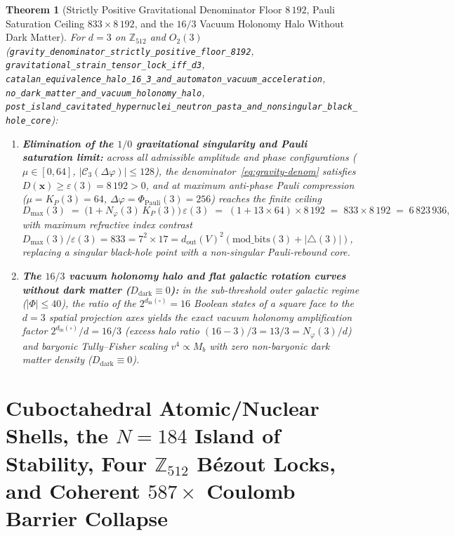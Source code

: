 \documentclass[11pt,a4paper]{article}
\theoremstyle{plain}
\newtheorem{theorem}{Theorem}[section]
\theoremstyle{definition}
\begin{document}
\begin{theorem}[Strictly Positive Gravitational Denominator Floor $8\,192$, Pauli Saturation Ceiling $833\times 8\,192$, and the $16/3$ Vacuum Holonomy Halo Without Dark Matter]
\label{thm:gravity-halo}
For $d=3$ on $\mathbb{Z}_{512}$ and $O_2(3)$ (\texttt{gravity\_denominator\_strictly\_positive\_floor\_8192}, \texttt{gravitational\_strain\_tensor\_lock\_iff\_d3}, \texttt{catalan\_equivalence\_halo\_16\_3\_and\_automaton\_vacuum\_acceleration}, \texttt{no\_dark\_matter\_and\_vacuum\_holonomy\_halo}, \texttt{post\_island\_cavitated\_hypernuclei\_neutron\_pasta\_and\_nonsingular\_black\_hole\_core}):
\begin{enumerate}[label=\textbf{(\roman*)},leftmargin=*]
\item \textbf{Elimination of the $1/0$ gravitational singularity and Pauli saturation limit:}
  across all admissible amplitude and phase configurations ($\mu\in[0,64]$, $|\mathcal{C}_3(\Delta\varphi)|\le 128$), the denominator~\eqref{eq:gravity-denom} satisfies $D(\mathbf{x}) \ge \varepsilon(3) = 8\,192 > 0$, and at maximum anti-phase Pauli compression ($\mu = K_P(3) = 64$, $\Delta\varphi = \Phi_{\mathrm{Pauli}}(3) = 256$) reaches the finite ceiling
  \begin{equation}
    \label{eq:pauli-max-833}
    D_{\max}(3) \;=\; \bigl(1 + N_\varphi(3)\,K_P(3)\bigr)\,\varepsilon(3) \;=\; (1 + 13\times 64)\times 8\,192 \;=\; 833\times 8\,192 \;=\; 6\,823\,936,
  \end{equation}
  with maximum refractive index contrast $D_{\max}(3)/\varepsilon(3) = 833 = 7^2\times 17 = d_{\mathrm{out}}(V)^2(\mathrm{mod\_bits}(3)+|{\triangle}(3)|)$, replacing a singular black-hole point with a non-singular Pauli-rebound core.
\item \textbf{The $16/3$ vacuum holonomy halo and flat galactic rotation curves without dark matter ($D_{\mathrm{dark}}\equiv 0$):}
  in the sub-threshold outer galactic regime ($|\Phi|\le 40$), the ratio of the $2^{d_{\mathrm{in}}(\square)} = 16$ Boolean states of a square face to the $d=3$ spatial projection axes yields the exact vacuum holonomy amplification factor $2^{d_{\mathrm{in}}(\square)}/d = 16/3$ (excess halo ratio $(16-3)/3 = 13/3 = N_\varphi(3)/d$) and baryonic Tully--Fisher scaling $v^4\propto M_b$ with zero non-baryonic dark matter density ($D_{\mathrm{dark}}\equiv 0$).
\end{enumerate}
\end{theorem}

\section{Cuboctahedral Atomic/Nuclear Shells, the \texorpdfstring{$N=184$}{N=184} Island of Stability, Four \texorpdfstring{$\mathbb{Z}_{512}$}{Z512} B\'ezout Locks, and Coherent \texorpdfstring{$587\times$}{587x} Coulomb Barrier Collapse}
\label{sec:nuclear-587}
\end{document}
